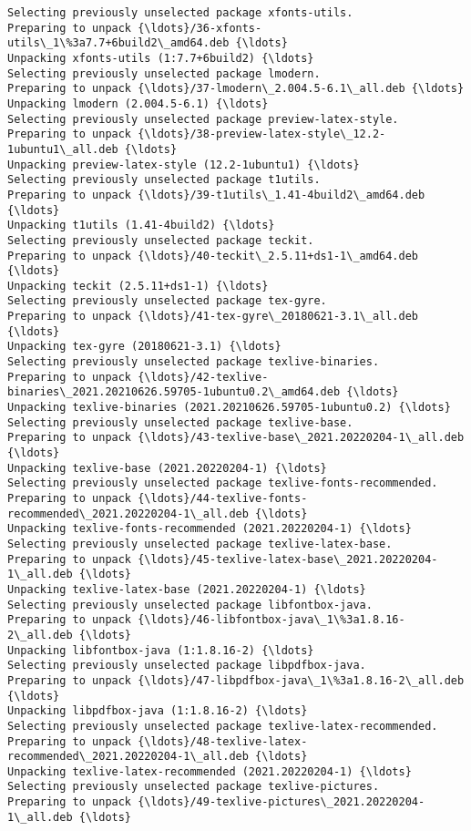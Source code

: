\documentclass[11pt]{article}
\begin{document}
\begin{Verbatim}[commandchars=\\\{\}]
Selecting previously unselected package xfonts-utils.
Preparing to unpack {\ldots}/36-xfonts-utils\_1\%3a7.7+6build2\_amd64.deb {\ldots}
Unpacking xfonts-utils (1:7.7+6build2) {\ldots}
Selecting previously unselected package lmodern.
Preparing to unpack {\ldots}/37-lmodern\_2.004.5-6.1\_all.deb {\ldots}
Unpacking lmodern (2.004.5-6.1) {\ldots}
Selecting previously unselected package preview-latex-style.
Preparing to unpack {\ldots}/38-preview-latex-style\_12.2-1ubuntu1\_all.deb {\ldots}
Unpacking preview-latex-style (12.2-1ubuntu1) {\ldots}
Selecting previously unselected package t1utils.
Preparing to unpack {\ldots}/39-t1utils\_1.41-4build2\_amd64.deb {\ldots}
Unpacking t1utils (1.41-4build2) {\ldots}
Selecting previously unselected package teckit.
Preparing to unpack {\ldots}/40-teckit\_2.5.11+ds1-1\_amd64.deb {\ldots}
Unpacking teckit (2.5.11+ds1-1) {\ldots}
Selecting previously unselected package tex-gyre.
Preparing to unpack {\ldots}/41-tex-gyre\_20180621-3.1\_all.deb {\ldots}
Unpacking tex-gyre (20180621-3.1) {\ldots}
Selecting previously unselected package texlive-binaries.
Preparing to unpack {\ldots}/42-texlive-
binaries\_2021.20210626.59705-1ubuntu0.2\_amd64.deb {\ldots}
Unpacking texlive-binaries (2021.20210626.59705-1ubuntu0.2) {\ldots}
Selecting previously unselected package texlive-base.
Preparing to unpack {\ldots}/43-texlive-base\_2021.20220204-1\_all.deb {\ldots}
Unpacking texlive-base (2021.20220204-1) {\ldots}
Selecting previously unselected package texlive-fonts-recommended.
Preparing to unpack {\ldots}/44-texlive-fonts-recommended\_2021.20220204-1\_all.deb {\ldots}
Unpacking texlive-fonts-recommended (2021.20220204-1) {\ldots}
Selecting previously unselected package texlive-latex-base.
Preparing to unpack {\ldots}/45-texlive-latex-base\_2021.20220204-1\_all.deb {\ldots}
Unpacking texlive-latex-base (2021.20220204-1) {\ldots}
Selecting previously unselected package libfontbox-java.
Preparing to unpack {\ldots}/46-libfontbox-java\_1\%3a1.8.16-2\_all.deb {\ldots}
Unpacking libfontbox-java (1:1.8.16-2) {\ldots}
Selecting previously unselected package libpdfbox-java.
Preparing to unpack {\ldots}/47-libpdfbox-java\_1\%3a1.8.16-2\_all.deb {\ldots}
Unpacking libpdfbox-java (1:1.8.16-2) {\ldots}
Selecting previously unselected package texlive-latex-recommended.
Preparing to unpack {\ldots}/48-texlive-latex-recommended\_2021.20220204-1\_all.deb {\ldots}
Unpacking texlive-latex-recommended (2021.20220204-1) {\ldots}
Selecting previously unselected package texlive-pictures.
Preparing to unpack {\ldots}/49-texlive-pictures\_2021.20220204-1\_all.deb {\ldots}

\end{Verbatim}
\end{document}
